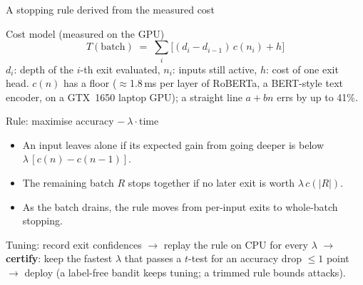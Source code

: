 \documentclass[11pt]{beamer}
\begin{document}
\begin{frame}{A stopping rule derived from the measured cost}
  \begin{block}{Cost model (measured on the GPU)}
    \vspace{-0.4em}
    \[ T(\text{batch}) \;=\; \sum_i \big[(d_i - d_{i-1})\,c(n_i) + h\big] \]
    {\footnotesize $d_i$: depth of the $i$-th exit evaluated, $n_i$: inputs still active, $h$: cost of one exit head.
     $c(n)$ has a floor ($\approx$1.8\,ms per layer of RoBERTa, a BERT-style text encoder, on a GTX~1650 laptop GPU); a straight line $a+bn$ errs by up to 41\%.}
  \end{block}
  \begin{block}{Rule: maximise accuracy $-\ \lambda\cdot$time }
    \footnotesize
    \begin{itemize}
      \item An input leaves alone if its expected gain from going deeper is below $\lambda\,[c(n)-c(n-1)]$.
      \item The remaining batch $R$ stops together if no later exit is worth $\lambda\,c(|R|)$.
      \item As the batch drains, the rule moves from per-input exits to whole-batch stopping.
    \end{itemize}
  \end{block}
  \footnotesize Tuning: record exit confidences $\to$ replay the rule on CPU for every $\lambda$ $\to$ \textbf{certify}: keep the
  fastest $\lambda$ that passes a $t$-test for an accuracy drop $\le 1$ point $\to$ deploy (a label-free bandit keeps
  tuning; a trimmed rule bounds attacks).
\end{frame}
\end{document}
